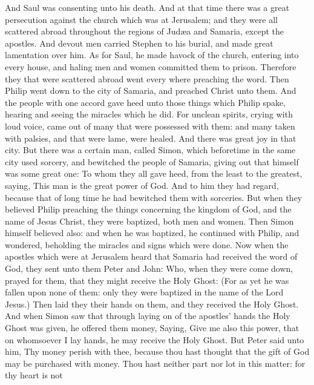  And Saul was consenting unto his death. And at that time
there was a great persecution against the church which was at Jerusalem;
and they were all scattered abroad throughout the regions of Judæa and
Samaria, except the apostles.  And devout men carried
Stephen to his burial, and made great lamentation over him. 
As for Saul, he made havock of the church, entering into every house,
and haling men and women committed them to prison. 
Therefore they that were scattered abroad went every where preaching the
word.  Then Philip went down to the city of Samaria, and
preached Christ unto them.  And the people with one accord
gave heed unto those things which Philip spake, hearing and seeing the
miracles which he did.  For unclean spirits, crying with
loud voice, came out of many that were possessed with them: and many
taken with palsies, and that were lame, were healed.  And
there was great joy in that city.  But there was a certain
man, called Simon, which beforetime in the same city used sorcery, and
bewitched the people of Samaria, giving out that himself was some great
one:  To whom they all gave heed, from the least to the
greatest, saying, This man is the great power of God.  And
to him they had regard, because that of long time he had bewitched them
with sorceries.  But when they believed Philip preaching
the things concerning the kingdom of God, and the name of Jesus Christ,
they were baptized, both men and women.  Then Simon himself
believed also: and when he was baptized, he continued with Philip, and
wondered, beholding the miracles and signs which were done.
 Now when the apostles which were at Jerusalem heard that
Samaria had received the word of God, they sent unto them Peter and
John:  Who, when they were come down, prayed for them, that
they might receive the Holy Ghost:  (For as yet he was
fallen upon none of them: only they were baptized in the name of the
Lord Jesus.)  Then laid they their hands on them, and they
received the Holy Ghost.  And when Simon saw that through
laying on of the apostles' hands the Holy Ghost was given, he offered
them money,  Saying, Give me also this power, that on
whomsoever I lay hands, he may receive the Holy Ghost.  But
Peter said unto him, Thy money perish with thee, because thou hast
thought that the gift of God may be purchased with money. 
Thou hast neither part nor lot in this matter: for thy heart is not
